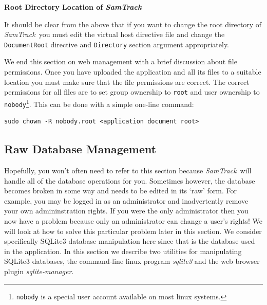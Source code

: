\documentclass[12pt,twoside]{article}
\newcommand{\samtrack}{\emph{SamTrack}}
\begin{document}
\begin{plainblock}
\begin{center}
\bfseries Root Directory Location of \samtrack
\end{center}
It should be clear from the above that if you want to change the root
directory of \samtrack\  you must edit the
virtual host directive file and change the \verb=DocumentRoot= directive
and \verb=Directory= section argument appropriately.
\end{plainblock}

We end this section on web management with a brief discussion about
file permissions. Once you have uploaded the application and all its
files to a suitable location you must make sure that the file permissions
are correct. The correct permissions for all files are to set group
ownership to \verb=root= and user ownership to \verb=nobody=\footnote{%
\texttt{nobody} is a special user account available on most linux
systems.}. This can be done with a simple one-line command:
\begin{verbatim}
sudo chown -R nobody.root <application document root>
\end{verbatim}

\subsection{Raw Database Management}
Hopefully, you won't often need to refer to this section because
\samtrack\  will handle all of the database operations
for you. Sometimes however, the database becomes broken in some way
and needs to be edited in its `raw' form. For example, you may
be logged in as an administrator and inadvertently remove your own
admininstration rights. If you were the only administrator then you now
have a problem because only an administrator can change a user's rights!
We will look at how to solve this particular problem later in this
section. We consider specifically SQLite3 database manipulation here
since that is the database used in the application.
In this section we describe two utilities for manipulating
SQLite3 databases, the command-line linux program \emph{sqlite3} and
the web browser plugin \emph{sqlite-manager}\cite{sqlitemanager}.
\end{document}
